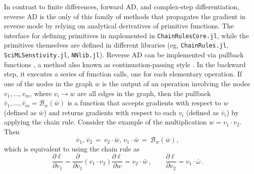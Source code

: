 In contrast to finite differences, forward AD, and complex-step differentiation, reverse AD is the only of this family of methods that propagates the gradient in reverse mode by relying on analytical derivatives of primitive functions.
The interface for defining primitives in implemented in \texttt{ChainRulesCore.jl}, while the primitives themselves are defined in different libraries (eg, \texttt{ChainRules.jl}, \texttt{SciMLSenstivity.jl}, \texttt{NNlib.jl}). 
Reverse AD can be implemented via pullback functions \cite{Innes_2018}, a method also known as continuation-passing style \cite{Wang_Zheng_Decker_Wu_Essertel_Rompf_2019}.
In the backward step, it executes a series of function calls, one for each elementary operation.
If one of the nodes in the graph $w$ is the output of an operation involving the nodes $v_1, \ldots, v_m$, where $v_i \rightarrow w$ are all edges in the graph, then the pullback $\bar v_1, \ldots, \bar v_m = \mathcal B_w(\bar w)$ is a function that accepts gradients with respect to $w$ (defined as $\bar w$) and returns gradients with respect to each $v_i$ (defined as $\bar v_i$) by applying the chain rule. 
Consider the example of the multiplication $w = v_1 \cdot v_2$. 
Then
\begin{equation}
 \bar v_1, \, \bar v_2 
 \,=\,
 v_2 \cdot \bar w , \,
 v_1 \cdot \bar w 
 \,=\,
 \mathcal{B}_w (\bar w),
\end{equation}
which is equivalent to using the chain rule as
\begin{equation}
 \frac{\partial \ell}{\partial v_1} 
 = \frac{\partial}{\partial v_1}(v_1 \cdot v_2) \frac{\partial \ell}{\partial w}
 =
 v_2 \cdot \bar w \, , \qquad 
 \frac{\partial \ell}{\partial v_2} = v_1 \cdot \bar \omega \, .
\end{equation}

